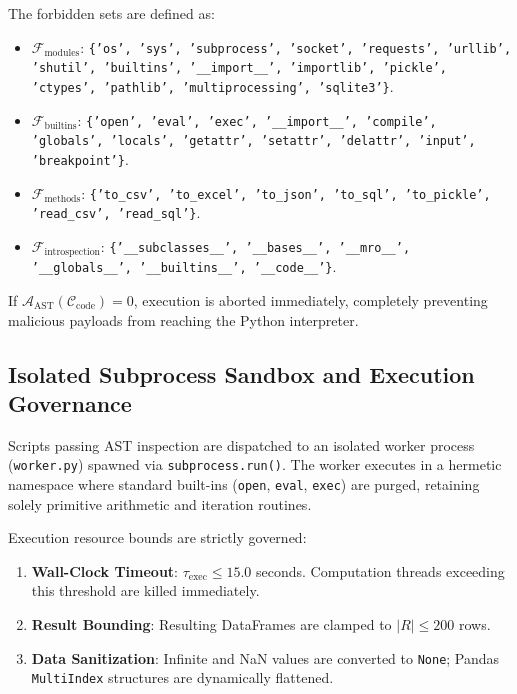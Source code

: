 \documentclass[conference]{IEEEtran}
\begin{document}
The forbidden sets are defined as:
\begin{itemize}
    \item $\mathcal{F}_{\text{modules}}$: \texttt{\{'os', 'sys', 'subprocess', 'socket', 'requests', 'urllib', 'shutil', 'builtins', '\_\_import\_\_', 'importlib', 'pickle', 'ctypes', 'pathlib', 'multiprocessing', 'sqlite3'\}}.
    \item $\mathcal{F}_{\text{builtins}}$: \texttt{\{'open', 'eval', 'exec', '\_\_import\_\_', 'compile', 'globals', 'locals', 'getattr', 'setattr', 'delattr', 'input', 'breakpoint'\}}.
    \item $\mathcal{F}_{\text{methods}}$: \texttt{\{'to\_csv', 'to\_excel', 'to\_json', 'to\_sql', 'to\_pickle', 'read\_csv', 'read\_sql'\}}.
    \item $\mathcal{F}_{\text{introspection}}$: \texttt{\{'\_\_subclasses\_\_', '\_\_bases\_\_', '\_\_mro\_\_', '\_\_globals\_\_', '\_\_builtins\_\_', '\_\_code\_\_'\}}.
\end{itemize}
If $\mathcal{A}_{\text{AST}}(\mathcal{C}_{\text{code}}) = 0$, execution is aborted immediately, completely preventing malicious payloads from reaching the Python interpreter.

\subsection{Isolated Subprocess Sandbox and Execution Governance}
Scripts passing AST inspection are dispatched to an isolated worker process (\texttt{worker.py}) spawned via \texttt{subprocess.run()}. The worker executes in a hermetic namespace where standard built-ins (\texttt{open}, \texttt{eval}, \texttt{exec}) are purged, retaining solely primitive arithmetic and iteration routines.

Execution resource bounds are strictly governed:
\begin{enumerate}
    \item \textbf{Wall-Clock Timeout}: $\tau_{\text{exec}} \le 15.0$ seconds. Computation threads exceeding this threshold are killed immediately.
    \item \textbf{Result Bounding}: Resulting DataFrames are clamped to $|R| \le 200$ rows.
    \item \textbf{Data Sanitization}: Infinite and NaN values are converted to \texttt{None}; Pandas \texttt{MultiIndex} structures are dynamically flattened.
\end{enumerate}
\end{document}

